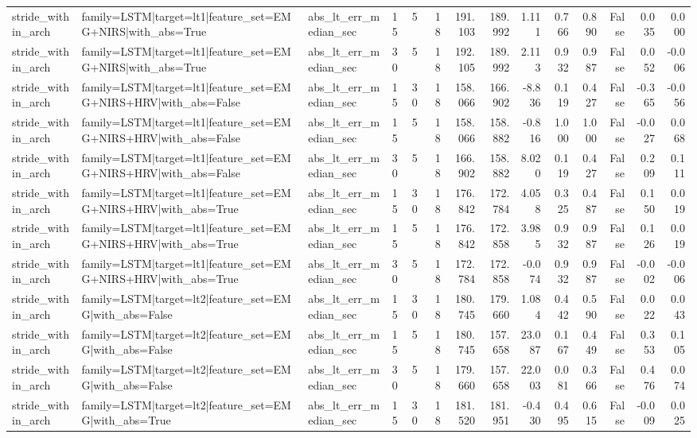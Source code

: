 \begin{table}
\begin{tabular}{lllllrrrrrrrrr}
stride_within_arch & family=LSTM|target=lt1|feature_set=EMG+NIRS|with_abs=True & abs_lt_err_median_sec & 15 & 5 & 18 & 191.103 & 189.992 & 1.111 & 0.766 & 0.890 & False & 0.035 & 0.000 \\
stride_within_arch & family=LSTM|target=lt1|feature_set=EMG+NIRS|with_abs=True & abs_lt_err_median_sec & 30 & 5 & 18 & 192.105 & 189.992 & 2.113 & 0.932 & 0.987 & False & 0.052 & -0.006 \\
stride_within_arch & family=LSTM|target=lt1|feature_set=EMG+NIRS+HRV|with_abs=False & abs_lt_err_median_sec & 15 & 30 & 18 & 158.066 & 166.902 & -8.836 & 0.119 & 0.427 & False & -0.365 & -0.056 \\
stride_within_arch & family=LSTM|target=lt1|feature_set=EMG+NIRS+HRV|with_abs=False & abs_lt_err_median_sec & 15 & 5 & 18 & 158.066 & 158.882 & -0.816 & 1.000 & 1.000 & False & -0.027 & 0.068 \\
stride_within_arch & family=LSTM|target=lt1|feature_set=EMG+NIRS+HRV|with_abs=False & abs_lt_err_median_sec & 30 & 5 & 18 & 166.902 & 158.882 & 8.020 & 0.119 & 0.427 & False & 0.209 & 0.111 \\
stride_within_arch & family=LSTM|target=lt1|feature_set=EMG+NIRS+HRV|with_abs=True & abs_lt_err_median_sec & 15 & 30 & 18 & 176.842 & 172.784 & 4.058 & 0.325 & 0.487 & False & 0.150 & 0.019 \\
stride_within_arch & family=LSTM|target=lt1|feature_set=EMG+NIRS+HRV|with_abs=True & abs_lt_err_median_sec & 15 & 5 & 18 & 176.842 & 172.858 & 3.985 & 0.932 & 0.987 & False & 0.126 & 0.019 \\
stride_within_arch & family=LSTM|target=lt1|feature_set=EMG+NIRS+HRV|with_abs=True & abs_lt_err_median_sec & 30 & 5 & 18 & 172.784 & 172.858 & -0.074 & 0.932 & 0.987 & False & -0.002 & -0.006 \\
stride_within_arch & family=LSTM|target=lt2|feature_set=EMG|with_abs=False & abs_lt_err_median_sec & 15 & 30 & 18 & 180.745 & 179.660 & 1.084 & 0.442 & 0.590 & False & 0.022 & 0.043 \\
stride_within_arch & family=LSTM|target=lt2|feature_set=EMG|with_abs=False & abs_lt_err_median_sec & 15 & 5 & 18 & 180.745 & 157.658 & 23.087 & 0.167 & 0.449 & False & 0.353 & 0.105 \\
stride_within_arch & family=LSTM|target=lt2|feature_set=EMG|with_abs=False & abs_lt_err_median_sec & 30 & 5 & 18 & 179.660 & 157.658 & 22.003 & 0.081 & 0.366 & False & 0.476 & 0.074 \\
stride_within_arch & family=LSTM|target=lt2|feature_set=EMG|with_abs=True & abs_lt_err_median_sec & 15 & 30 & 18 & 181.520 & 181.951 & -0.430 & 0.495 & 0.615 & False & -0.009 & 0.025 \\

\end{tabular}
\end{table}

